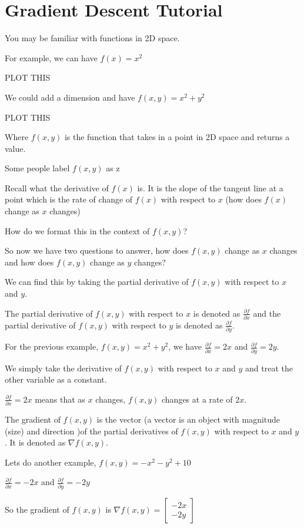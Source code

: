 \documentclass{article}
\author{David Saldubehere}
\begin{document}
\section{Gradient Descent Tutorial}
You may be familiar with functions in 2D space.

For example, we can have \(f(x) = x^2\)

PLOT THIS

We could add a dimension and have $f(x, y) = x^2 + y^2$

PLOT THIS

Where $f(x, y)$ is the function that takes in a point in 2D space and returns a value.

Some people label $f(x, y)$ as z

Recall what the derivative of $f(x)$ is. It is the slope of the tangent line at a point which is the rate of change of $f(x)$ with respect to $x$ (how does $f(x)$ change as $x$ changes) 

How do we format this in the context of $f(x, y)$?

So now we have two questions to answer, how does $f(x, y)$ change as $x$ changes and how does $f(x, y)$ change as $y$ changes?

We can find this by taking the partial derivative of $f(x, y)$ with respect to $x$ and $y$.

The partial derivative of $f(x, y)$ with respect to $x$ is denoted as $\frac{\partial f}{\partial x}$ and the partial derivative of $f(x, y)$ with respect to $y$ is denoted as $\frac{\partial f}{\partial y}$.

For the previous example, $f(x, y) = x^2 + y^2$, we have $\frac{\partial f}{\partial x} = 2x$ and $\frac{\partial f}{\partial y} = 2y$.

We simply take the derivative of $f(x, y)$ with respect to $x$ and $y$ and treat the other variable as a constant.

$\frac{\partial f}{\partial x} = 2x$ means that as $x$ changes, $f(x, y)$ changes at a rate of $2x$.

The gradient of $f(x, y)$ is the vector (a vector is an object with magnitude (size) and direction )of the partial derivatives of $f(x, y)$ with respect to $x$ and $y$. It is denoted as $\nabla f(x, y)$.

Lets do another example, $f(x, y) = -x^2 -y^2 + 10$

$\frac{\partial f}{\partial x} = -2x$ and $\frac{\partial f}{\partial y} = -2y$

So the gradient of $f(x, y)$ is $\nabla f(x, y) = \begin{bmatrix} -2x \\ -2y \end{bmatrix}$
\end{document}
